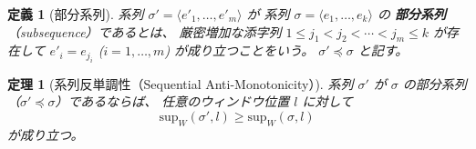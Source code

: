\documentclass[11pt,a4paper]{article}
\newtheorem{definition}{定義}[section]
\newtheorem{theorem}{定理}[section]
\begin{document}
\begin{definition}[部分系列]
\label{def:subseq}
系列 $\sigma' = \langle e'_1, \ldots, e'_m \rangle$ が
系列 $\sigma = \langle e_1, \ldots, e_k \rangle$ の
\textbf{部分系列}（subsequence）であるとは、
厳密増加な添字列 $1 \le j_1 < j_2 < \cdots < j_m \le k$ が存在して
$e'_i = e_{j_i}$ ($i = 1, \ldots, m$) が成り立つことをいう。
$\sigma' \preceq \sigma$ と記す。
\end{definition}

\begin{theorem}[系列反単調性（Sequential Anti-Monotonicity）]
\label{thm:anti_mono}
系列 $\sigma'$ が $\sigma$ の部分系列（$\sigma' \preceq \sigma$）であるならば、
任意のウィンドウ位置 $l$ に対して
\[
  \mathrm{sup}_W(\sigma', l) \ge \mathrm{sup}_W(\sigma, l)
\]
が成り立つ。
\end{theorem}
\end{document}
